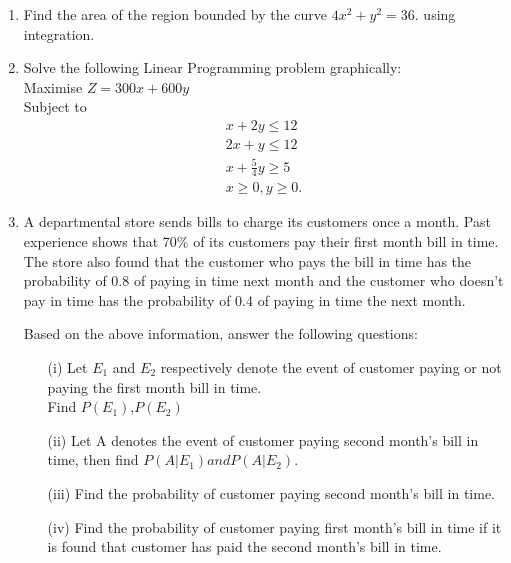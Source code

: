 \documentclass{article}
\begin{document}
\begin{enumerate}
\item Find the area of the region bounded by the curve $ 4x^2 + y^2 =36$. using integration.


\item Solve the following Linear Programming problem graphically:\\ Maximise $Z=300x + 600y $\\
	Subject to \begin{align*}x + 2y \le 12\\
		2x + y \le 12\\
		x +\frac{5}{4}y \ge 5\\
		x \ge 0 , y \ge 0.\end{align*} 

\item A departmental store sends bills to charge its customers once a month. Past experience shows that 70\% of its customers pay their first month bill in time. The store also found that the customer who pays the bill in time has the probability of 0.8 of paying in time next month and the customer who doesn't pay in time has the probability of 0.4 of paying in time the next month.

Based on the above information, answer the following questions:		
\begin{enumerate}
	\item[(i)] Let $E_{1}$ and $E_{2}$ respectively denote the event of customer paying or not paying the first month bill in time.\\ Find $P(E_{1})$,$P(E_{2})$
	\item[(ii)] Let A denotes the event of customer paying second month's bill in time, then find $P( A|E_{1} ) and P( A |E_{2})$.
	\item[(iii)] Find the probability of customer paying second month's bill in time.
	\item[(iv)] Find the probability of customer paying first month's bill in time if it is found that customer has paid the second month's bill in time.
\end{enumerate}



\end{enumerate}
\end{document}
